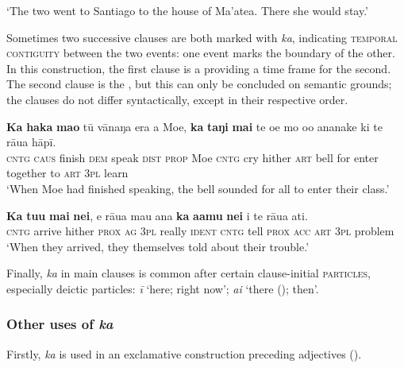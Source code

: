 \glt 
‘The two went to Santiago to the house of Ma’atea. There she would stay.’ \textstyleExampleref{[R210.221]} 
\z

Sometimes two successive clauses are both marked with \textit{ka}, indicating \textsc{temporal contiguity} between the two events: one event marks the boundary of the other. In this construction, the first clause is a  providing a time frame for the second. The second clause is the , but this can only be concluded on semantic grounds; the clauses do not differ syntactically, except in their respective order. 

\ea\label{ex:7.52}
\gll \textbf{Ka} \textbf{haka} \textbf{mao} tū vānaŋa era a Moe, \textbf{ka} \textbf{taŋi} \textbf{mai} te oe  mo o{\ꞌ}o ananake ki te rāua hāpī.\\
\textsc{cntg} \textsc{caus} finish \textsc{dem} speak \textsc{dist} \textsc{prop} Moe \textsc{cntg} cry hither \textsc{art} bell  for enter together to \textsc{art} \textsc{3pl} learn\\

\glt 
‘When Moe had finished speaking, the bell sounded for all to enter their class.’ \textstyleExampleref{[R315.075]} 
\z

\ea\label{ex:7.53}
\gll \textbf{Ka} \textbf{tu{\ꞌ}u} \textbf{mai} \textbf{nei}, e rāua mau {\ꞌ}ana \textbf{ka} \textbf{{\ꞌ}a{\ꞌ}amu} \textbf{nei}  i te rāua {\ꞌ}ati.\\
\textsc{cntg} arrive hither \textsc{prox} \textsc{ag} \textsc{3pl} really \textsc{ident} \textsc{cntg} tell \textsc{prox}  \textsc{acc} \textsc{art} \textsc{3pl} problem\\

\glt 
‘When they arrived, they themselves told about their trouble.’ \textstyleExampleref{[R361.035]} 
\z

Finally, \textit{ka} in main clauses is common after certain clause-initial \textsc{particles}, especially deictic particles: \textit{{\ꞌ}ī} ‘here; right now’; \textit{{\ꞌ}ai} ‘there (); then’.

\subsubsection[Other uses of ka]{Other uses of \textit{ka}}\label{sec:7.2.6.4}

Firstly, \textit{ka} is used in an exclamative construction preceding adjectives ().

